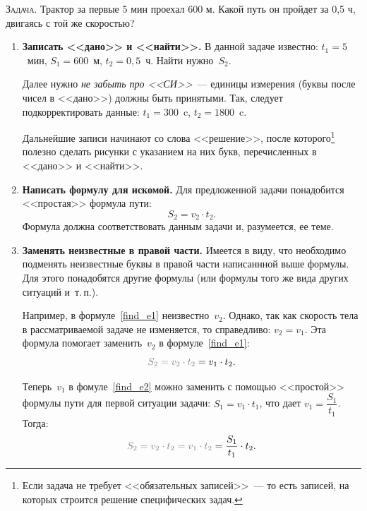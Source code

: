 \documentclass[main.tex]{subfiles}
\begin{document}
\noindent\textsc{Задача}. Трактор за первые 5 мин проехал 600 м. Какой путь он пройдет за 0,5 ч, двигаясь с той же скоростью?
\begin{enumerate}
    \item \textbf{Записать <<дано>> и <<найти>>.} В данной задаче известно: $t_1=5$~мин, $S_1=600$~м, $t_2=0{,}5$~ч. Найти нужно~$S_2$.

    Далее нужно \emph{не забыть про <<СИ>>}~--- единицы измерения (буквы после чисел в <<дано>>) должны быть принятыми. Так, следует подкорректировать данные: $t_1=300$~c, $t_2=1800$~c.

    Дальнейшие записи начинают со слова <<решение>>, после которого\footnote{Если задача не требует <<обязательных записей>>~--- то есть записей, на которых строится решение специфических задач.} полезно сделать рисунки с указанием на них букв, перечисленных в <<дано>> и <<найти>>.
    
    \item\label{it2} \textbf{Написать формулу для искомой.} Для предложенной задачи понадобится <<простая>> формула пути:
    \begin{equation}
        \label{find_e1}
        S_2=v_2\cdot t_2.
    \end{equation}
    Формула должна соответствовать данным задачи и, разумеется, ее теме.

    \item\label{it3} \textbf{Заменять неизвестные в правой части.} Имеется в виду, что необходимо подменять неизвестные буквы в правой части написаннной выше формулы. Для этого понадобятся другие формулы (или формулы того же вида других ситуаций и~т.\,п.).

    Например, в формуле~\eqref{find_e1} неизвестно~$v_2$. Однако, так как скорость тела в рассматриваемой задаче не изменяется, то справедливо: $v_2=v_1$. Эта формула помогает заменить~$v_2$ в формуле~\eqref{find_e1}:
    \begin{equation}
        \label{find_e2}
        \textcolor{gray}{S_2=v_2\cdot t_2}=v_1\cdot t_2.
    \end{equation}

    Теперь~$v_1$ в фомуле~\eqref{find_e2} можно заменить с помощью <<простой>> формулы пути для первой ситуации задачи: $S_1=v_1\cdot t_1$, что дает $v_1=\dfrac{S_1}{t_1}$. Тогда:
    \begin{equation}
        \label{find_e3}
        \textcolor{gray}{S_2=v_2\cdot t_2=v_1\cdot t_2}=\frac{S_1}{t_1}\cdot t_2.
    \end{equation}


\end{enumerate}
\end{document}
